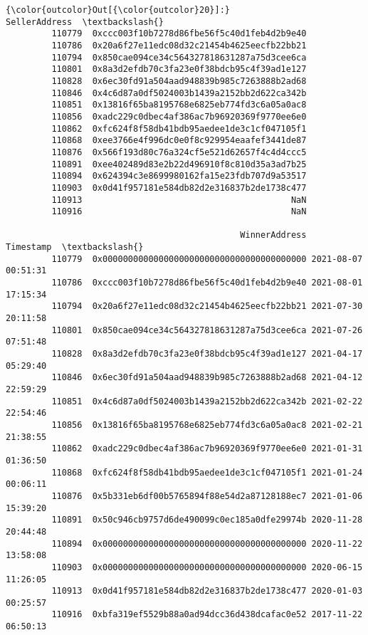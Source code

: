 \documentclass[11pt]{article}
\begin{document}
\begin{Verbatim}[commandchars=\\\{\}]
{\color{outcolor}Out[{\color{outcolor}20}]:}                                      SellerAddress  \textbackslash{}
         110779  0xccc003f10b7278d86fbe56f5c40d1feb4d2b9e40   
         110786  0x20a6f27e11edc08d32c21454b4625eecfb22bb21   
         110794  0x850cae094ce34c564327818631287a75d3cee6ca   
         110801  0x8a3d2efdb70c3fa23e0f38bdcb95c4f39ad1e127   
         110828  0x6ec30fd91a504aad948839b985c7263888b2ad68   
         110846  0x4c6d87a0df5024003b1439a2152bb2d622ca342b   
         110851  0x13816f65ba8195768e6825eb774fd3c6a05a0ac8   
         110856  0xadc229c0dbec4af386ac7b96920369f9770ee6e0   
         110862  0xfc624f8f58db41bdb95aedee1de3c1cf047105f1   
         110868  0xee3766e4f996dc0e0f8c929954eaafef3441de87   
         110876  0x566f193d80c76a324cf5e521d62657f4c4d4ccc5   
         110891  0xee402489d83e2b22d496910f8c810d35a3ad7b25   
         110894  0x624394c3e8699980162fa15e23fdb707d9a53517   
         110903  0x0d41f957181e584db82d2e316837b2de1738c477   
         110913                                         NaN   
         110916                                         NaN   
         
                                              WinnerAddress           Timestamp  \textbackslash{}
         110779  0x0000000000000000000000000000000000000000 2021-08-07 00:51:31   
         110786  0xccc003f10b7278d86fbe56f5c40d1feb4d2b9e40 2021-08-01 17:15:34   
         110794  0x20a6f27e11edc08d32c21454b4625eecfb22bb21 2021-07-30 20:11:58   
         110801  0x850cae094ce34c564327818631287a75d3cee6ca 2021-07-26 07:51:48   
         110828  0x8a3d2efdb70c3fa23e0f38bdcb95c4f39ad1e127 2021-04-17 05:29:40   
         110846  0x6ec30fd91a504aad948839b985c7263888b2ad68 2021-04-12 22:59:29   
         110851  0x4c6d87a0df5024003b1439a2152bb2d622ca342b 2021-02-22 22:54:46   
         110856  0x13816f65ba8195768e6825eb774fd3c6a05a0ac8 2021-02-21 21:38:55   
         110862  0xadc229c0dbec4af386ac7b96920369f9770ee6e0 2021-01-31 01:36:50   
         110868  0xfc624f8f58db41bdb95aedee1de3c1cf047105f1 2021-01-24 00:06:11   
         110876  0x5b331eb6df00b5765894f88e54d2a87128188ec7 2021-01-06 15:39:20   
         110891  0x50c946cb9757d6de490099c0ec185a0dfe29974b 2020-11-28 20:44:48   
         110894  0x0000000000000000000000000000000000000000 2020-11-22 13:58:08   
         110903  0x0000000000000000000000000000000000000000 2020-06-15 11:26:05   
         110913  0x0d41f957181e584db82d2e316837b2de1738c477 2020-01-03 00:25:57   
         110916  0xbfa319ef5529b88a0ad94dcc36d438dcafac0e52 2017-11-22 06:50:13   
         

\end{Verbatim}
\end{document}
